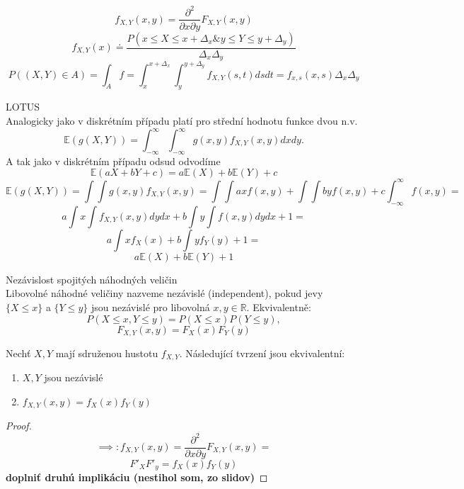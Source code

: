 \documentclass[../main.tex]{subfiles}
\begin{document}
\begin{remark}
    \[f_{X,Y}(x,y) = \frac{\partial^2}{\partial x \partial y} F_{X,Y}(x,y)\]
    \[f_{X,Y}(x) \doteq \frac{P(x\leq X \leq x + \Delta_x \& y\leq Y \leq y + \Delta_y)}{\Delta_x \Delta_y}\]
    \[P((X,Y)\in A) = \int_A f = \int^{x+\Delta_x}_x \int^{y+\Delta_y}_y f_{X,Y}(s,t)dsdt = f_{x,s}(x,s)\Delta_x \Delta_y\]
\end{remark}

\begin{definition}
    LOTUS\\

    Analogicky jako v diskrétním případu platí pro střední hodnotu funkce dvou n.v.
    \[\mathbb{E}(g(X,Y)) = \int^\infty_{-\infty} \int^\infty_{-\infty} g(x,y)f_{X,Y}(x,y)dxdy.\]
    A tak jako v diskrétním případu odsud odvodíme
    \[\mathbb{E}(aX+bY+c) = a\mathbb{E}(X) + b\mathbb{E}(Y) + c\]
    \[\mathbb{E}(g(X,Y)) = \int \int g(x,y)f_{X,Y}(x,y) = \int \int ax f(x,y) + \int \int by f(x,y) + c \int^\infty_{-\infty}f(x,y)=\]
    \[a \int x \int f_{X,Y}(x,y)dydx + b \int y \int f(x,y)dydx + 1 =\]
    \[a \int xf_X(x) + b \int yf_Y(y) + 1 = \]
    \[ a\mathbb{E}(X) + b\mathbb{E}(Y) + 1\]
\end{definition}

\begin{definition}
    Nezávislost spojitých náhodných veličin\\

    Libovolné náhodné veličiny nazveme nezávislé (independent), pokud jevy $\{X\leq x\}$ a $\{Y\leq y\}$ jsou nezávislé pro libovolná $x,y \in \mathbb{R}$. Ekvivalentně:
    \[P(X\leq x, Y\leq y) = P(X\leq x)P(Y\leq y),\]
    \[F_{X,Y}(x,y) = F_X(x)F_Y(y)\]
\end{definition}
\begin{theorem}
    Nechť $X,Y$ mají sdruženou hustotu $f_{X,Y}$. Následující tvrzení jsou ekvivalentní:
    \begin{enumerate}
        \item $X,Y$ jsou nezávislé
        \item $f_{X,Y}(x,y) = f_X(x) f_Y(y)$
    \end{enumerate}
    
    \begin{proof}
        \[\implies : f_{X,Y}(x,y) = \frac{\partial^2}{\partial x \partial y} F_{X,Y}(x,y) = \]
        \[F'_X F'_y = f_X(x)f_Y(y)\]
        \textbf{doplniť druhú implikáciu (nestihol som, zo slidov)}
    \end{proof}
\end{theorem}
\end{document}
